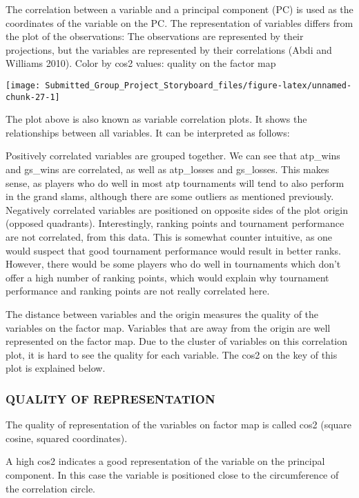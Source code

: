 \documentclass[]{article}
\begin{document}
The correlation between a variable and a principal component (PC) is
used as the coordinates of the variable on the PC. The representation of
variables differs from the plot of the observations: The observations
are represented by their projections, but the variables are represented
by their correlations (Abdi and Williams 2010). Color by cos2 values:
quality on the factor map

\begin{center}\texttt{[image: Submitted\_Group\_Project\_Storyboard\_files/figure-latex/unnamed-chunk-27-1]} \end{center}

The plot above is also known as variable correlation plots. It shows the
relationships between all variables. It can be interpreted as follows:

Positively correlated variables are grouped together. We can see that
atp\_wins and gs\_wins are correlated, as well as atp\_losses and
gs\_losses. This makes sense, as players who do well in most atp
tournaments will tend to also perform in the grand slams, although there
are some outliers as mentioned previously. Negatively correlated
variables are positioned on opposite sides of the plot origin (opposed
quadrants). Interestingly, ranking points and tournament performance are
not correlated, from this data. This is somewhat counter intuitive, as
one would suspect that good tournament performance would result in
better ranks. However, there would be some players who do well in
tournaments which don't offer a high number of ranking points, which
would explain why tournament performance and ranking points are not
really correlated here.

The distance between variables and the origin measures the quality of
the variables on the factor map. Variables that are away from the origin
are well represented on the factor map. Due to the cluster of variables
on this correlation plot, it is hard to see the quality for each
variable. The cos2 on the key of this plot is explained below.

\subsubsection{QUALITY OF
REPRESENTATION}\label{quality-of-representation}

The quality of representation of the variables on factor map is called
cos2 (square cosine, squared coordinates).

A high cos2 indicates a good representation of the variable on the
principal component. In this case the variable is positioned close to
the circumference of the correlation circle.
\end{document}
